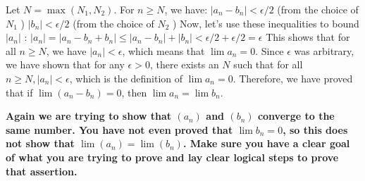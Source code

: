 \documentclass{report}
\begin{document}
Let $N=\max \left(N_1, N_2\right)$. For $n \geq N$, we have: $\left|a_n-b_n\right|<\epsilon / 2$ (from the choice of $N_1$ )
$\left|b_n\right|<\epsilon / 2$ (from the choice of $N_2$ )
Now, let's use these inequalities to bound $\left|a_n\right|$ :
$\left|a_n\right|=\left|a_n-b_n+b_n\right| \leq\left|a_n-b_n\right|+\left|b_n\right|<\epsilon / 2+\epsilon / 2=\epsilon$
This shows that for all $n \geq N$, we have $\left|a_n\right|<\epsilon$, which means that $\lim a_n=0$.
Since $\epsilon$ was arbitrary, we have shown that for any $\epsilon>0$, there exists an $N$ such that for all $n \geq N,\left|a_n\right|<\epsilon$, which is the definition of $\lim a_n=0$.
Therefore, we have proved that if $\lim \left(a_n-b_n\right)=0$, then $\lim a_n=\lim b_n$.
\par
\textbf{Again we are trying to show that $(a_n)$ and $(b_n)$ converge to the same number. You have not even proved that $\lim b_n = 0$, so this does not show that $\lim (a_n) = \lim (b_n)$. Make sure you have a clear goal of what you are trying to prove and lay clear logical steps to prove that assertion.}
\end{document}
